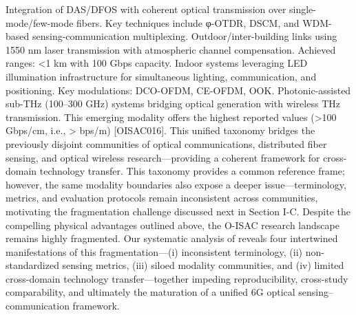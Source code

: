 {}\markdownRendererOlBegin
{} Integration of DAS/DFOS with coherent optical transmission over single-mode/few-mode fibers. Key techniques include φ-OTDR, DSCM, and WDM-based sensing-communication multiplexing.\markdownRendererOlItemEnd 
{} Outdoor/inter-building links using 1550 nm laser transmission with atmospheric channel compensation. Achieved ranges: <1 km with 100 Gbps capacity.\markdownRendererOlItemEnd 
{} Indoor systems leveraging LED illumination infrastructure for simultaneous lighting, communication, and positioning. Key modulations: DCO-OFDM, CE-OFDM, OOK.\markdownRendererOlItemEnd 
{} Photonic-assisted sub-THz (100–300 GHz) systems bridging optical generation with wireless THz transmission. This emerging modality offers the highest reported  values (>100 Gbps/cm, i.e., > bps/m) [O\markdownRendererUnderscore{}ISAC\markdownRendererUnderscore{}016].\markdownRendererOlItemEnd 
\markdownRendererOlEnd \markdownRendererInterblockSeparator
{}This unified taxonomy bridges the previously disjoint communities of optical communications, distributed fiber sensing, and optical wireless research—providing a coherent framework for cross-domain technology transfer. This taxonomy provides a common reference frame; however, the same modality boundaries also expose a deeper issue—terminology, metrics, and evaluation protocols remain inconsistent across communities, motivating the fragmentation challenge discussed next in Section I-C.\markdownRendererInterblockSeparator
{}
\markdownRendererSectionEnd 
\markdownRendererSectionEnd \markdownRendererSectionBegin
{}\markdownRendererInterblockSeparator
{}Despite the compelling physical advantages outlined above, the O-ISAC research landscape remains highly fragmented. Our systematic analysis of  reveals four intertwined manifestations of this fragmentation—(i) inconsistent terminology, (ii) non-standardized sensing metrics, (iii) siloed modality communities, and (iv) limited cross-domain technology transfer—together impeding reproducibility, cross-study comparability, and ultimately the maturation of a unified 6G optical sensing–communication framework.\markdownRendererParagraphSeparator
